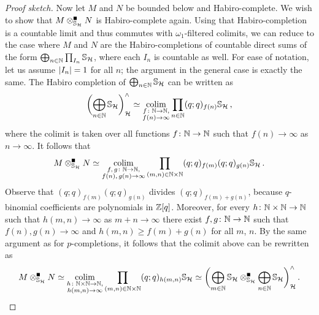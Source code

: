 \documentclass[DIV=12,numbers=enddot,leqno,bibliography=totoc]{scrartcl}
\begin{document}
\begin{proof}[Proof sketch]
		Now let $M$ and $N$ be bounded below and Habiro-complete. We wish to show that $M\soltimes_{\IS_\Hh}N$ is Habiro-complete again. Using that Habiro-completion is a countable limit and thus commutes with $\omega_1$-filtered colimits, we can reduce to the case where $M$ and $N$ are the Habiro-completions of countable direct sums of the form $\bigoplus_{n\in\mathbb{N}}\prod_{I_n}\mathbb{S}_{\mathcal{H}}$, where each $I_n$ is countable as well. For ease of notation, let us assume $\lvert I_n\rvert=1$ for all $n$; the argument in the general case is exactly the same. The Habiro completion of $\bigoplus_{n\in\mathbb{N}}\mathbb{S}_{\mathcal{H}}$ can be written as
		\begin{equation*}
			\biggl(\bigoplus_{n\in\IN}\IS_\Hh\biggr)_\Hh^\complete\simeq \colimit_{\substack{f\colon \IN\rightarrow \IN,\\
					f(n)\rightarrow \infty}}\prod_{n\in\IN}(q;q)_{f(n)}\IS_\Hh\,,
		\end{equation*}
		where the colimit is taken over all functions $f\colon \IN\rightarrow \IN$ such that $f(n)\rightarrow \infty$ as $n\rightarrow\infty$. It follows that
		\begin{equation*}
			M\soltimes_{\IS_\Hh}N\simeq \colimit_{\substack{f,\,g\colon\IN\rightarrow \IN,\\f(n),\,g(n)\rightarrow \infty}}\prod_{(m,n)\in\IN\times\IN}(q;q)_{f(m)}(q;q)_{g(n)}\IS_\Hh\,.		
		\end{equation*}
		Observe that $(q;q)_{f(m)}(q;q)_{g(n)}$ divides $(q;q)_{f(m)+g(n)}$, because $q$-binomial coefficients are polynomials in $\mathbb{Z}[q]$. Moreover, for every $h\colon \IN\times\IN\rightarrow \IN$ such that $h(m,n)\rightarrow \infty$ as $m+n\rightarrow \infty$ there exist $f,g\colon \IN\rightarrow \IN$ such that $f(n),g(n)\rightarrow \infty$ and $h(m,n)\geqslant f(m)+g(n)$ for all $m$, $n$. By the same argument as for $p$-completions, it follows that the colimit above can be rewritten as
		\begin{equation*}
			M\soltimes_{\IS_\Hh}N\simeq \colimit_{\substack{h\colon \IN\times\IN\rightarrow \IN,\\ h(m,n)\rightarrow \infty}}\prod_{(m,n)\in\IN\times\IN}(q;q)_{h(m,n)}\IS_\Hh\simeq \biggl(\bigoplus_{m\in\IN}\IS_\Hh\soltimes_{\IS_\Hh}\bigoplus_{n\in\IN}\IS_\Hh\biggr)_\Hh^\complete\,.\qedhere
		\end{equation*}
	\end{proof}
	
	

	
	
	
	\newpage 
	\renewcommand{\SectionPrefix}{}
	
	\renewcommand{\bibfont}{\small}
	\printbibliography
\end{document}
